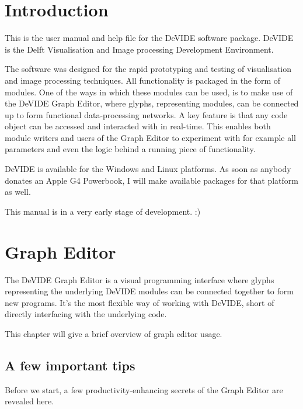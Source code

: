 \chapter{Introduction}%
%
%
\setfooter{\thepage}{}{}{}{}{\thepage}%
This is the user manual and help file for the DeVIDE software package.
DeVIDE is the Delft Visualisation and Image processing Development
Environment.

The software was designed for the rapid prototyping and testing of
visualisation and image processing techniques.  All functionality is
packaged in the form of modules.  One of the ways in which these
modules can be used, is to make use of the DeVIDE Graph Editor, where
glyphs, representing modules, can be connected up to form functional
data-processing networks.  A key feature is that any code object can
be accessed and interacted with in real-time.  This enables both
module writers and users of the Graph Editor to experiment with for
example all parameters and even the logic behind a running piece of
functionality.

DeVIDE is available for the Windows and Linux platforms.  As soon as
anybody donates an Apple G4 Powerbook, I will make available packages
for that platform as well.

This manual is in a very early stage of development. :)

\chapter{Graph Editor}
%
%
\setfooter{\thepage}{}{}{}{}{\thepage}%

The DeVIDE Graph Editor is a visual programming interface where glyphs
representing the underlying DeVIDE modules can be connected together
to form new programs.  It's the most flexible way of working with
DeVIDE, short of directly interfacing with the underlying code.

This chapter will give a brief overview of graph editor usage.

\section{A few important tips}
Before we start, a few productivity-enhancing secrets of the Graph
Editor are revealed here.

